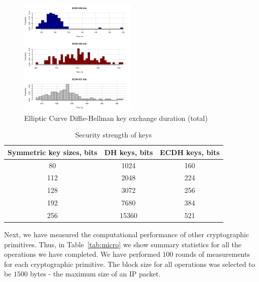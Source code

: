 \begin{figure}
	\includegraphics[width=0.5\textwidth]{graphics/ecdh_computation_hist.pdf}
	\caption{Elliptic Curve Diffie-Hellman key exchange duration (total)}
	\label{fig:ecdh}
\end{figure}

\begin{table}
\centering
\begin{tabular}{|c|c|c|}
\hline
\bf{Symmetric key sizes, bits} & \bf{DH keys, bits} & \bf{ECDH keys, bits} \\\hline
		80			&    1024                        & 160                                  \\
		112			&    2048                        & 224                                  \\
		128			&    3072                        & 256                                  \\
		192			&    7680                        & 384                                  \\
		256			&    15360                       & 521                                  \\
\hline
\end{tabular}
\caption{Security strength of keys}
\label{tab:strength}
\end{table}

Next, we have measured the computational performance of other 
cryptographic primitives. Thus, in Table~\ref{tab:micro} we 
show summary statistics for all the operations we have completed.
We have performed $100$ rounds of measurements for each 
cryptographic primitive. The block size for all operations
was selected to be $1500$ bytes - the maximum size of an IP packet.

